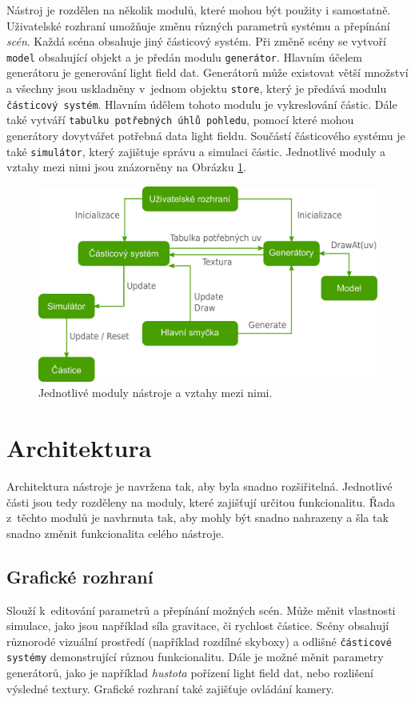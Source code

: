 Nástroj je rozdělen na několik modulů, které mohou být použity i samostatně. Uživatelské rozhraní umožňuje změnu různých parametrů systému a přepínání \emph{scén}. Každá scéna obsahuje jiný částicový systém. Při změně scény se vytvoří \texttt{model} obsahující objekt a je předán modulu \texttt{generátor}. Hlavním účelem generátoru je generování light field dat. Generátorů může existovat větší množství a všechny jsou uskladněny v~jednom objektu \texttt{store}, který je předává modulu \texttt{částicový systém}. Hlavním údělem tohoto modulu je vykreslování částic. Dále také vytváří \texttt{tabulku potřebných úhlů pohledu}, pomocí které mohou generátory dovytvářet potřebná data light fieldu. Součástí částicového systému je také \texttt{simulátor}, který zajištuje správu a simulaci částic. Jednotlivé moduly a vztahy mezi nimi jsou znázorněny na Obrázku \ref{fig:navrh_uml}.

\begin{figure}[H]
	\centering
		\includegraphics[width=1.0\textwidth]{obrazky-figures/diagrambpfull.pdf}
	\caption{Jednotlivé moduly nástroje a vztahy mezi nimi.}
	\label{fig:navrh_uml}
\end{figure}



\section{Architektura}
\label{sec_architecture}
Architektura nástroje je navržena tak, aby byla snadno rozšiřitelná. Jednotlivé části jsou tedy rozděleny na moduly, které zajišťují určitou funkcionalitu. Řada z~těchto modulů je navhrnuta tak, aby mohly být snadno nahrazeny a šla tak snadno změnit funkcionalita celého nástroje.
\subsection*{Grafické rozhraní} Slouží k~editování parametrů a přepínání možných scén. Může měnit vlastnosti simulace, jako jsou například síla gravitace, či rychlost částice. Scény obsahují různorodé vizuální prostředí (například rozdílné skyboxy) a odlišné \texttt{částicové systémy} demonstrující různou funkcionalitu. Dále je možné měnit parametry generátorů, jako je například \emph{hustota} pořízení light field dat, nebo rozlišení výsledné textury. Grafické rozhraní také zajišťuje ovládání kamery.  
